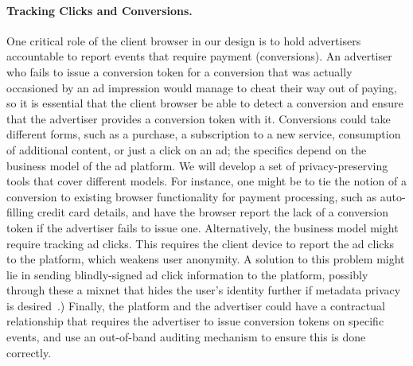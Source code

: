 \paragraph{Tracking Clicks and Conversions.}
%
One critical role of the client browser in our design is to hold advertisers accountable to report events that require payment (\ie conversions).
%
An advertiser who fails to issue a conversion token for a conversion that was actually occasioned by an ad impression would manage to cheat their way out of paying, so it is essential that the client browser be able to detect a conversion and ensure that the advertiser provides a conversion token with it.
%
Conversions could take different forms, such as a purchase, a subscription to a new service, consumption of additional content, or just a click on an ad; the specifics depend on the business model of the ad platform.
%
We will develop a set of privacy-preserving tools that cover different models.
%
For instance, one might be to tie the notion of a conversion to existing browser functionality for payment processing, such as auto-filling credit card details, and have the browser report the lack of a conversion token if the advertiser fails to issue one.
%
%
%
%
Alternatively, the business model might require tracking ad clicks.
%
This requires the client device to report the ad clicks to the platform, which weakens user anonymity.
%
A solution to this problem might lie in sending blindly-signed ad click information to the platform, possibly through these a mixnet that hides the user's identity further if metadata privacy is desired~\cite{vuvuzela,tor}.)
%
Finally, the platform and the advertiser could have a contractual relationship that requires the advertiser to issue conversion tokens on specific events, and use an out-of-band auditing mechanism to ensure this is done correctly.
%

